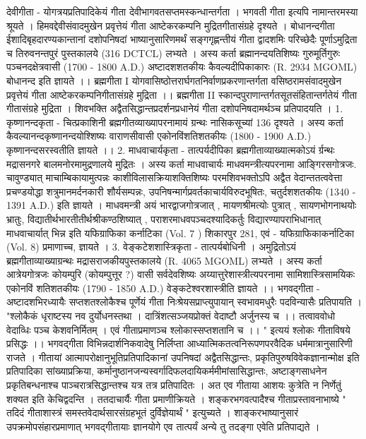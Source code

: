 देवीगीता - 
योगत्रयप्रतिपादिकेयं गीता देवीभागवतसप्तमस्कन्धान्तर्गता । भगवती गीता इत्यपि नामान्तरमस्या श्रूयते । हिमवद्देवीसंवादमुखेन प्रवृत्तेयं गीता आष्टेकरकम्पनि मुद्रितगीतासंग्रहे दृश्यते । 
बोधानन्दगीता 
ईशादिबृहदारण्यकान्तानां दशोपनिषदां भाष्यानुसारिणमर्थं सङ्गगृह्णन्तीयं गीता द्वादशमिः परिच्छेदैः पूर्णाऽमुद्रिता च तिरुवनन्तपुरं पुस्तकालये (316 DCTCL) लभ्यते । 
अस्य कर्ता ब्रह्मानन्दयतिशिष्यः गुरुमूर्तिगुरुः पञ्चनदक्षेत्रवासी (1700 - 1800 A.D.) अष्टादशशतकीयः कैवल्यदीपिकाकारः (R. 2934 MGOML) बोधानन्द इति ज्ञायते ।।
ब्रह्मगीता I 
योगवासिष्ठोत्तरार्घगतनिर्वाणप्रकरणान्तर्गता वसिष्ठरामसंवादमुखेन प्रवृत्तेयं गीता आष्टेकरकम्पनिगीतासंग्रहे मुद्रिता ।।
ब्रह्मगीता II
स्कान्दपुराणान्तर्गतसूतसंहितान्तर्गतेयं गीता गीतासंग्रहे मुद्रिता । शिवभक्ति अद्वैतसिद्धान्तप्रदर्शनप्रधानेयं गीता दशोपनिषदामर्थञ्च प्रतिपादयति । 
1. कृष्णानन्दकृता - चित्प्रकाशिनी 
ब्रह्मगीतव्याख्यापरनामायं ग्रन्थः नासिकसूच्यां 136 दृश्यते । अस्य कर्ता कैवल्यानन्दकृष्णानन्दयोश्शिष्यः वाराणसीवासी एकोनविंशतिशतकीयः (1800 - 1900 A.D.) कृष्णानन्दसरस्वतीति ज्ञायते ।।
2. माधवाचार्यकृता - तात्पर्यदीपिका 
ब्रह्मगीताव्याख्यात्मकोऽयं र्ग्रन्थः मद्रासनगरे बालमनोरमामुद्रणालये मुद्रितः । अस्य कर्ता माधवाचार्यः माधवमन्त्रीत्यपरनामा आङ्गिरसगोत्रजः. चावुण्ड्यात् माचाम्बिकायामुत्पन्नः काशीविलासक्रियाशक्तिशिष्यः परमशिवभक्तोऽपि अद्वैत वेदान्ततत्ववेत्ता प्रचण्डयोद्धा शत्रुमानमर्दनकारी शौर्यसम्पन्नः, उपनिषन्मार्गप्रवर्तकाचार्यविरुदभूषितः, चतुर्दशशतकीयः (1340 - 1391 A.D.) इति ज्ञायते । माधवमन्त्री अयं भारद्वाजगोत्रजात् , मायणश्रीमत्योः पुत्रात् , सायणभोगनाथयोः भ्रातुः, विद्यातीर्थभारतीतीर्थश्रीकण्ठशिष्यात् , पराशरमाधवपञ्चदश्यादिकर्तुः विद्यारण्यापराभिधानात् माधवाचार्यात् भिन्न इति यफिग्राफिका कर्नाटिका (Vol. 7 ) शिकारपुर 281,  एवं - यफिग्राफिकाकर्नाटिका (Vol. 8) प्रमाणाच्च, ज्ञायते । 
3. वेङ्कटेशशास्त्रिकृता - तात्पर्यबोधिनी ।
अमुद्रितोऽयं ब्रह्मगीताव्याख्याग्रन्थः मद्रासराजकीयपुस्तकालये (R. 4065 MGOML) लभ्यते । अस्य कर्ता आत्रेयगोत्रजः कोयम्पुरि (कोयम्पुत्तूर ?) वासी सर्वदेवशिष्यः अय्यात्तुरेशास्त्रीत्यपरनामा सामिशास्त्रिसामयिकः एकोनविं शतिशतकीयः (1790 - 1850 A.D.) वेङ्कटेश्वरशास्त्रीति ज्ञायते ।। 
भगवद्गीता - 
अष्टादशभिरध्यायैः सप्तशतश्लोकैश्च पूर्णेयं गीता निःश्रेयसप्राप्त्युपायान् स्वभावमधुरैः पदविन्यासैः प्रतिपायति । 
"श्लोकैकं धृराष्टस्य नव दुर्योधनस्तथा । 
दात्रिंशत्सञ्जयप्रोक्तं वेदाष्टौ अर्जुनस्य च ।।
तत्वाववोधो वेदाव्धिः पञ्च केशवनिर्मितम् ।
एवं गीताप्रमाणञ्च श्लोकास्सप्तशतानि च ।। "
इत्ययं श्लोकः गीताविषये प्रसिद्धः ।। भगवद्गीता विभिन्नदार्शनिकवादेषु निर्लिप्ता आध्यात्मिकतत्वनिरूपणपरवैदिक धर्ममात्रानुसारिणी राजते । गीतायां आत्मापरोक्षानुभूतिप्रतिपादिकानां उपनिषदां अद्वैतसिद्धान्तः, प्रकृतिपुरुषविवेकज्ञानान्मोक्ष इति प्रतिपादिका सांख्याप्रक्रिया, कर्मानुष्ठानजन्यस्वर्गादिफलदायिकर्ममीमांसासिद्धान्तः, अष्टाङ्गसाधनेन प्रकृतिबन्धनाश्च पाञ्चरात्रसिद्धान्तश्च यत्र तत्र प्रतिपादितः । अत एव गीताया आशयः कुत्रेति न निर्णेतुं शक्यत इति केचिद्वदन्ति । ततदाचार्यैः गीता प्रमाणीक्रियते । शङ्करभगवत्पादैश्च गीताप्रस्तावनाभाष्ये " तदिदं गीताशास्त्रं समस्तवेदार्थसारसंग्रहभूतं दुर्विज्ञेयार्थं " इत्युच्यते । शाङ्करभाष्यानुसारं उपक्रमोपसंहारप्रमाणात् भगवद्गीतायाः ज्ञानयोगे एव तात्पर्यं अन्ये तु तदङ्गा एवेति प्रतिपाद्यते । 

